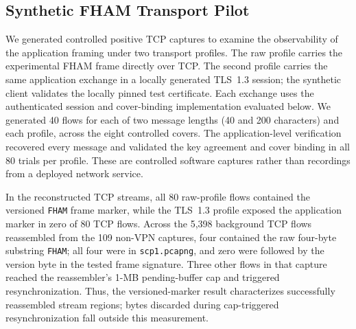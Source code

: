 \documentclass[preprint,12pt]{elsarticle}
\theoremstyle{plain}
\providecommand{\DIFaddtex}[1]{{\protect\color{blue} \sf #1}} %
\providecommand{\DIFdeltex}[1]{{\protect\color{red} \scriptsize #1}} %
\providecommand{\DIFaddbegin}{} %
\providecommand{\DIFaddend}{} %
\providecommand{\DIFdelbegin}{} %
\providecommand{\DIFdelend}{} %
\providecommand{\DIFadd}[1]{\texorpdfstring{\DIFaddtex{#1}}{#1}} %
\providecommand{\DIFdel}[1]{\texorpdfstring{\DIFdeltex{#1}}{}} %
\providecommand{\DIFscaledelfig}{0.5}
\newlength{\DIFdelgraphicswidth} %
\newlength{\DIFdelgraphicsheight} %
\providecommand{\DIFaddincludegraphics}[2][]{{\color{blue}\fbox{\DIFOincludegraphics[#1]{#2}}}} %
\providecommand{\DIFdelincludegraphics}[2][]{%
\sbox{\DIFdelgraphicsbox}{\DIFOincludegraphics[#1]{#2}}%
\settoboxwidth{\DIFdelgraphicswidth}{\DIFdelgraphicsbox} %
\settoboxtotalheight{\DIFdelgraphicsheight}{\DIFdelgraphicsbox} %
\scalebox{\DIFscaledelfig}{%
\parbox[b]{\DIFdelgraphicswidth}{\usebox{\DIFdelgraphicsbox}\\[-\baselineskip] \rule{\DIFdelgraphicswidth}{0em}}\llap{\resizebox{\DIFdelgraphicswidth}{\DIFdelgraphicsheight}{%
\setlength{\unitlength}{\DIFdelgraphicswidth}%
\begin{picture}(1,1)%
\thicklines\linethickness{2pt} %
{\color[rgb]{1,0,0}\put(0,0){\framebox(1,1){}}}%
{\color[rgb]{1,0,0}\put(0,0){\line( 1,1){1}}}%
{\color[rgb]{1,0,0}\put(0,1){\line(1,-1){1}}}%
\end{picture}%
}\hspace*{3pt}}} %
} %
\DeclareRobustCommand{\DIFaddbegin}{\DIFOaddbegin \let\includegraphics\DIFaddincludegraphics} %
\DeclareRobustCommand{\DIFaddend}{\DIFOaddend \let\includegraphics\DIFOincludegraphics} %
\DeclareRobustCommand{\DIFdelbegin}{\DIFOdelbegin \let\includegraphics\DIFdelincludegraphics} %
\DeclareRobustCommand{\DIFdelend}{\DIFOaddend \let\includegraphics\DIFOincludegraphics} %
\renewcommand{\DIFdel}[1]{}
\renewcommand{\DIFdelincludegraphics}[2][]{}
\begin{document}
\begin{table}[H]
\centering
\small
\caption{Packet-Local FHAM Marker Scan in the ISCXVPN2016 Non-VPN Captures}
\label{tab:nonvpn_signature_baseline}

\end{table}

\subsection{Synthetic FHAM Transport Pilot}

We generated controlled positive TCP captures to examine the observability of
the application framing under two transport profiles. The raw profile carries
the experimental FHAM frame directly over TCP. The second profile carries the
same application exchange in a locally generated TLS~1.3 session; the synthetic
client validates the locally pinned test certificate. Each exchange uses the
authenticated session and cover-binding implementation evaluated below. We
generated 40 flows for each of two message lengths (40 and 200 characters) and
each profile, across the eight controlled covers. The application-level
verification recovered every message and validated the key agreement and
cover binding in all 80 trials per profile. These are controlled software captures \DIFdelbegin \DIFdel{, not captures }\DIFdelend \DIFaddbegin \DIFadd{rather than recordings }\DIFaddend from a deployed
network service.

In the reconstructed TCP streams, all 80 raw-profile flows contained the
versioned \texttt{FHAM} frame marker, \DIFdelbegin \DIFdel{whereas none of }\DIFdelend \DIFaddbegin \DIFadd{while }\DIFaddend the TLS~1.3 \DIFdelbegin \DIFdel{flows exposed that }\DIFdelend \DIFaddbegin \DIFadd{profile exposed the }\DIFaddend application marker in \DIFdelbegin \DIFdel{the TCP
payload}\DIFdelend \DIFaddbegin \DIFadd{zero of 80 TCP
flows}\DIFaddend . Across the 5,398 background TCP
flows reassembled from the 109 non-VPN captures, four contained the raw
four-byte substring \texttt{FHAM}; all four were in \texttt{scp1.pcapng}, and
\DIFdelbegin \DIFdel{none was }\DIFdelend \DIFaddbegin \DIFadd{zero were }\DIFaddend followed by the version byte in the tested frame signature. Three
other flows in that capture reached the reassembler's 1-MB pending-buffer cap
and triggered resynchronization. Thus, the versioned-marker result \DIFdelbegin \DIFdel{applies to
the }\DIFdelend \DIFaddbegin \DIFadd{characterizes }\DIFaddend successfully reassembled
stream regions; \DIFdelbegin \DIFdel{it is not an exhaustive claim
about }\DIFdelend bytes discarded during cap-triggered resynchronization \DIFaddbegin \DIFadd{fall
outside this measurement}\DIFaddend .
\end{document}
